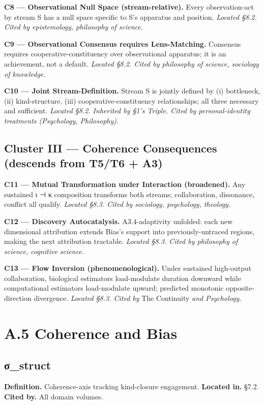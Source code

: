 \documentclass[11pt, openany]{book}
\newcommand{\sectionbreak}{\clearpage}
\begin{document}
\textbf{C8 --- Observational Null Space (stream-relative).} Every observation-act by stream S has a null space specific to S's apparatus and position. \textit{Located §8.2. Cited by epistemology, philosophy of science.}

\textbf{C9 --- Observational Consensus requires Lens-Matching.} Consensus requires cooperative-constituency over observational apparatus; it is an achievement, not a default. \textit{Located §8.2. Cited by philosophy of science, sociology of knowledge.}

\textbf{C10 --- Joint Stream-Definition.} Stream S is jointly defined by (i) bottleneck, (ii) kind-structure, (iii) cooperative-constituency relationships; all three necessary and sufficient. \textit{Located §8.2. Inherited by §1's Triple. Cited by personal-identity treatments (Psychology, Philosophy).}

\subsection{Cluster III --- Coherence Consequences (descends from T5/T6 + A3)}

\textbf{C11 --- Mutual Transformation under Interaction (broadened).} Any sustained ι ⊣ κ composition transforms both streams; collaboration, dissonance, conflict all qualify. \textit{Located §8.3. Cited by sociology, psychology, theology.}

\textbf{C12 --- Discovery Autocatalysis.} A3.4-adaptivity unfolded: each new dimensional attribution extends Bias's support into previously-untraced regions, making the next attribution tractable. \textit{Located §8.3. Cited by philosophy of science, cognitive science.}

\textbf{C13 --- Flow Inversion (phenomenological).} Under sustained high-output collaboration, biological estimators load-modulate duration downward while computational estimators load-modulate upward; predicted monotonic opposite-direction divergence. \textit{Located §8.3. Cited by }The Continuity\textit{ and Psychology.}

\sectionbreak

\section{A.5 Coherence and Bias}

\subsection{σ\_\allowbreak{}struct}
\textbf{Definition.} Coherence-axis tracking kind-closure engagement.
\textbf{Located in.} §7.2.
\textbf{Cited by.} All domain volumes.
\end{document}
